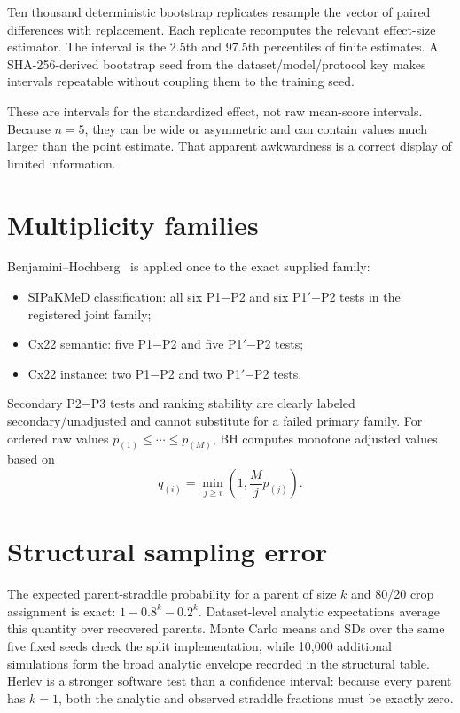 \documentclass[11pt,oneside]{report}
\newcommand{\protocol}[1]{\textsf{#1}}
\begin{document}
Ten thousand deterministic bootstrap replicates resample the vector of paired differences with replacement. Each replicate recomputes the relevant effect-size estimator. The interval is the 2.5th and 97.5th percentiles of finite estimates. A SHA-256-derived bootstrap seed from the dataset/model/protocol key makes intervals repeatable without coupling them to the training seed.

These are intervals for the standardized effect, not raw mean-score intervals. Because $n=5$, they can be wide or asymmetric and can contain values much larger than the point estimate. That apparent awkwardness is a correct display of limited information.

\section{Multiplicity families}

Benjamini--Hochberg~\cite{benjamini1995fdr} is applied once to the exact supplied family:
\begin{itemize}
  \item SIPaKMeD classification: all six \protocol{P1}$-$\protocol{P2} and six \protocol{P1$'$}$-$\protocol{P2} tests in the registered joint family;
  \item Cx22 semantic: five \protocol{P1}$-$\protocol{P2} and five \protocol{P1$'$}$-$\protocol{P2} tests;
  \item Cx22 instance: two \protocol{P1}$-$\protocol{P2} and two \protocol{P1$'$}$-$\protocol{P2} tests.
\end{itemize}
Secondary \protocol{P2}$-$\protocol{P3} tests and ranking stability are clearly labeled secondary/unadjusted and cannot substitute for a failed primary family. For ordered raw values $p_{(1)}\leq\cdots\leq p_{(M)}$, BH computes monotone adjusted values based on
\begin{equation}
q_{(i)}=\min_{j\geq i}\left(1,\frac{M}{j}p_{(j)}\right).
\end{equation}

\section{Structural sampling error}

The expected parent-straddle probability for a parent of size $k$ and 80/20 crop assignment is exact: $1-0.8^k-0.2^k$. Dataset-level analytic expectations average this quantity over recovered parents. Monte Carlo means and SDs over the same five fixed seeds check the split implementation, while 10,000 additional simulations form the broad analytic envelope recorded in the structural table. Herlev is a stronger software test than a confidence interval: because every parent has $k=1$, both the analytic and observed straddle fractions must be exactly zero.
\end{document}

